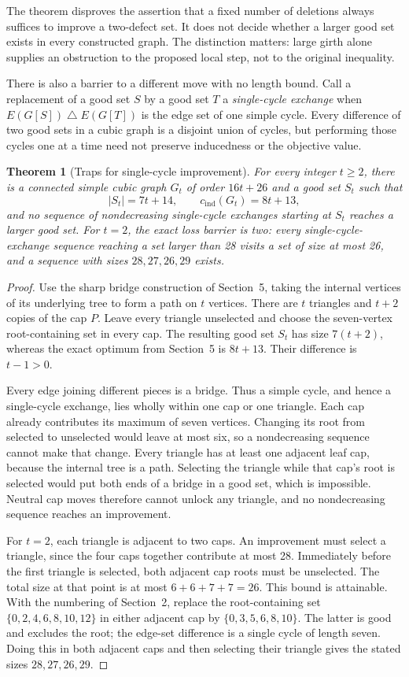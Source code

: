 \documentclass[11pt]{article}
\newtheorem{theorem}{Theorem}[section]
\newcommand{\cind}{c_{\mathrm{ind}}}
\begin{document}
The theorem disproves the assertion that a fixed number of deletions
always suffices to improve a two-defect set. It does not decide whether
a larger good set exists in every constructed graph. The distinction
matters: large girth alone supplies an obstruction to the proposed
local step, not to the original inequality.

There is also a barrier to a different move with no length bound.
Call a replacement of a good set $S$ by a good set $T$ a
\emph{single-cycle exchange} when
$E(G[S])\mathbin{\triangle}E(G[T])$ is the edge set of one
simple cycle. Every difference of two good sets in a cubic graph
is a disjoint union of cycles, but performing those cycles one
at a time need not preserve inducedness or the objective value.

\begin{theorem}[Traps for single-cycle improvement]\label{thm:cycle-trap}
For every integer $t\geq2$, there is a connected simple cubic
graph $G_t$ of order $16t+26$ and a good set $S_t$ such that
\[
 |S_t|=7t+14,\qquad \cind(G_t)=8t+13,
\]
and no sequence of nondecreasing single-cycle exchanges starting
at $S_t$ reaches a larger good set. For $t=2$, the exact loss
barrier is two: every single-cycle-exchange sequence reaching a
set larger than 28 visits a set of size at most 26, and a sequence
with sizes $28,27,26,29$ exists.
\end{theorem}
\begin{proof}
Use the sharp bridge construction of Section~5, taking the
internal vertices of its underlying tree to form a path on
$t$ vertices. There are $t$ triangles and $t+2$ copies of the
cap $P$. Leave every triangle unselected and choose the
seven-vertex root-containing set in every cap. The resulting
good set $S_t$ has size $7(t+2)$, whereas the exact optimum
from Section~5 is $8t+13$. Their difference is $t-1>0$.

Every edge joining different pieces is a bridge. Thus a simple
cycle, and hence a single-cycle exchange, lies wholly within
one cap or one triangle. Each cap already contributes its
maximum of seven vertices. Changing its root from selected to
unselected would leave at most six, so a nondecreasing sequence
cannot make that change. Every triangle has at least one
adjacent leaf cap, because the internal tree is a path.
Selecting the triangle while that cap's root is selected would
put both ends of a bridge in a good set, which is impossible.
Neutral cap moves therefore cannot unlock any triangle, and
no nondecreasing sequence reaches an improvement.

For $t=2$, each triangle is adjacent to two caps. An improvement
must select a triangle, since the four caps together contribute
at most 28. Immediately before the first triangle is selected,
both adjacent cap roots must be unselected. The total size at
that point is at most $6+6+7+7=26$.
This bound is attainable. With the numbering of Section~2,
replace the root-containing set
$\{0,2,4,6,8,10,12\}$ in either adjacent cap by
$\{0,3,5,6,8,10\}$. The latter is good and excludes the root;
the edge-set difference is a single cycle of length seven.
Doing this in both adjacent caps and then selecting their
triangle gives the stated sizes $28,27,26,29$.
\end{proof}
\end{document}
